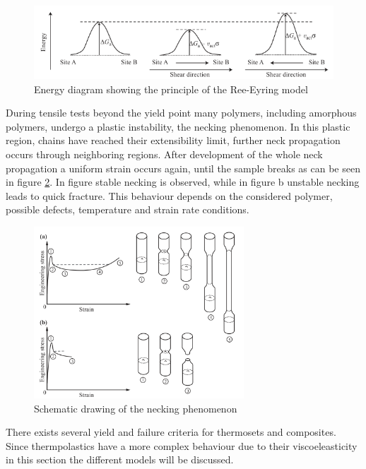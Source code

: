 \begin{figure}[htb]
    \centering
    \includegraphics[width=1.0\textwidth]{chapter_2/figures/Ree-Eyring.png}
    \caption{Energy diagram showing the principle of the Ree-Eyring model \cite{Halary2011PolymerMaterials}}
    \label{fig:Ree-Eyring}
\end{figure}
During tensile tests beyond the yield point many polymers, including amorphous polymers, undergo a plastic instability, the necking phenomenon. In this plastic region, chains have reached their extensibility limit, further neck propagation occurs through neighboring regions. After development of the whole neck propagation a uniform strain occurs again, until the sample breaks as can be seen in figure \ref{fig:Necking}. In figure stable necking is observed, while in figure b unstable necking leads to quick fracture. This behaviour depends on the considered polymer, possible defects, temperature and strain rate conditions. 
\begin{figure}[htb]
    \centering
    \includegraphics[width=0.7\textwidth]{chapter_2/figures/Necking.png}
    \caption{Schematic drawing of the necking phenomenon \cite{Halary2011PolymerMaterials}}
    \label{fig:Necking}
\end{figure}
There exists several yield and failure criteria for thermosets and composites. Since thermpolastics have a more complex behaviour due to their viscoeleasticity in this section the different models will be discussed. 
